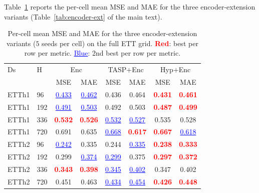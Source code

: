 Table~\ref{tab:encoder-cells} reports the per-cell mean MSE and
MAE for the three encoder-extension variants
(Table~\ref{tab:encoder-ext} of the main text).

\begin{table}[h]
  \caption{Per-cell mean MSE and MAE for the three
    encoder-extension variants ($5$ seeds per cell) on the full
    ETT grid. \textcolor{red}{\textbf{Red}}: best per row per
    metric. \textcolor{blue}{\underline{Blue}}: 2nd best per
    row per metric.}
  \label{tab:encoder-cells}
  \begin{center}
  \scriptsize
  \setlength{\tabcolsep}{3pt}
  \begin{tabular}{ll|cc|cc|cc}
    \toprule
    Ds & H & \multicolumn{2}{c|}{Enc} & \multicolumn{2}{c|}{TASP$+$Enc} & \multicolumn{2}{c}{Hyp$+$Enc} \\
       &   & MSE & MAE & MSE & MAE & MSE & MAE \\
    \midrule
    ETTh1 & 96  & \textcolor{blue}{\underline{0.433}} & \textcolor{blue}{\underline{0.462}} & 0.436 & 0.464 & \textcolor{red}{\textbf{0.431}} & \textcolor{red}{\textbf{0.461}} \\
    ETTh1 & 192 & \textcolor{blue}{\underline{0.491}} & \textcolor{blue}{\underline{0.503}} & 0.492 & 0.503 & \textcolor{red}{\textbf{0.487}} & \textcolor{red}{\textbf{0.499}} \\
    ETTh1 & 336 & \textcolor{red}{\textbf{0.532}} & \textcolor{red}{\textbf{0.526}} & \textcolor{blue}{\underline{0.532}} & \textcolor{blue}{\underline{0.527}} & 0.535 & 0.528 \\
    ETTh1 & 720 & 0.691 & 0.635 & \textcolor{blue}{\underline{0.668}} & \textcolor{red}{\textbf{0.617}} & \textcolor{red}{\textbf{0.667}} & \textcolor{blue}{\underline{0.618}} \\
    \midrule
    ETTh2 & 96  & \textcolor{blue}{\underline{0.242}} & 0.335 & 0.244 & \textcolor{blue}{\underline{0.335}} & \textcolor{red}{\textbf{0.238}} & \textcolor{red}{\textbf{0.333}} \\
    ETTh2 & 192 & 0.299 & \textcolor{blue}{\underline{0.374}} & \textcolor{blue}{\underline{0.299}} & 0.375 & \textcolor{red}{\textbf{0.297}} & \textcolor{red}{\textbf{0.372}} \\
    ETTh2 & 336 & \textcolor{red}{\textbf{0.343}} & \textcolor{red}{\textbf{0.398}} & \textcolor{blue}{\underline{0.345}} & \textcolor{blue}{\underline{0.402}} & 0.347 & 0.402 \\
    ETTh2 & 720 & 0.451 & 0.463 & \textcolor{blue}{\underline{0.434}} & \textcolor{blue}{\underline{0.454}} & \textcolor{red}{\textbf{0.426}} & \textcolor{red}{\textbf{0.448}} \\

\end{tabular}
\end{center}
\end{table}
